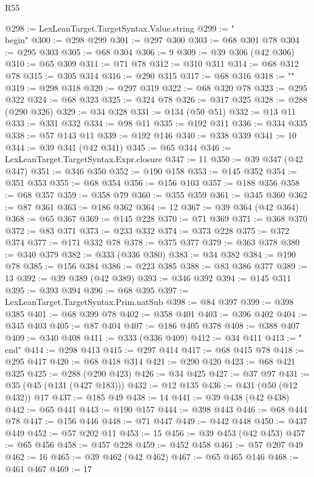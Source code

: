 \begin{lexlean}{R55}
\begin{coremodule}
{{{{{{{{{{{{{{{{{{{{{{{{{{{{{{{{{{{{{{{{{{{{{{{{{{{{{{{{{{{{@298 := LexLeanTarget.TargetSyntax.Value.string
@299 := "\\begin{"
@300 := @298 @299
@301 := @297 @300
@303 := @68 @301 @78
@304 := @295 @303
@305 := @68 @304
@306 := 9
@309 := @39 @306 (@42 @306)
@310 := @65 @309
@311 := @71 @78
@312 := @310 @311
@314 := @68 @312 @78
@315 := @305 @314
@316 := @290 @315
@317 := @68 @316
@318 := "}"
@319 := @298 @318
@320 := @297 @319
@322 := @68 @320 @78
@323 := @295 @322
@324 := @68 @323
@325 := @324 @78
@326 := @317 @325
@328 := @288 (@290 @326)
@329 := @34 @328
@331 := @134 (@50 @51)
@332 := @13 @11
@333 := @331 @332
@334 := @98 @11
@335 := @192 @311
@336 := @334 @335
@338 := @57 @143 @11
@339 := @192 @146
@340 := @338 @339
@341 := 10
@344 := @39 @341 (@42 @341)
@345 := @65 @344
@346 := LexLeanTarget.TargetSyntax.Expr.closure
@347 := 11
@350 := @39 @347 (@42 @347)
@351 := @346 @350
@352 := @190 @158
@353 := @145 @352
@354 := @351 @353
@355 := @68 @354
@356 := @156 @103
@357 := @188 @356
@358 := @68 @357
@359 := @358 @79
@360 := @355 @359
@361 := @345 @360
@362 := @87 @361
@363 := @186 @362
@364 := 12
@367 := @39 @364 (@42 @364)
@368 := @65 @367
@369 := @145 @228
@370 := @71 @369
@371 := @368 @370
@372 := @83 @371
@373 := @233 @332
@374 := @373 @228
@375 := @372 @374
@377 := @171 @332 @78
@378 := @375 @377
@379 := @363 @378
@380 := @340 @379
@382 := @333 (@336 @380)
@383 := @34 @382
@384 := @190 @78
@385 := @156 @384
@386 := @223 @385
@388 := @83 @386 @377
@389 := 13
@392 := @39 @389 (@42 @389)
@393 := @346 @392
@394 := @145 @311
@395 := @393 @394
@396 := @68 @395
@397 := LexLeanTarget.TargetSyntax.Prim.natSub
@398 := @84 @397
@399 := @398 @385
@401 := @68 @399 @78
@402 := @358 @401
@403 := @396 @402
@404 := @345 @403
@405 := @87 @404
@407 := @186 @405 @378
@408 := @388 @407
@409 := @340 @408
@411 := @333 (@336 @409)
@412 := @34 @411
@413 := "\\end{"
@414 := @298 @413
@415 := @297 @414
@417 := @68 @415 @78
@418 := @295 @417
@420 := @68 @418 @314
@421 := @290 @420
@423 := @68 @421 @325
@425 := @288 (@290 @423)
@426 := @34 @425
@427 := @37 @97
@431 := @35 (@45 (@131 (@427 @183)))
@432 := @12 @135
@436 := @431 (@50 (@12 @432)) @17
@437 := @185 @49
@438 := 14
@441 := @39 @438 (@42 @438)
@442 := @65 @441
@443 := @190 @157
@444 := @398 @443
@446 := @68 @444 @78
@447 := @156 @446
@448 := @71 @447
@449 := @442 @448
@450 := @437 @449
@452 := @57 @202 @11
@453 := 15
@456 := @39 @453 (@42 @453)
@457 := @65 @456
@458 := @457 @228
@459 := @452 @458
@461 := @57 @207 @49
@462 := 16
@465 := @39 @462 (@42 @462)
@467 := @65 @465 @146
@468 := @461 @467
@469 := 17
}}}}}}}}}}}}}}}}}}}}}}}}}}}}}}}}}}}}}}}}}}}}}}}}}}}}}}}}}}}}}
\end{coremodule}
\end{lexlean}
